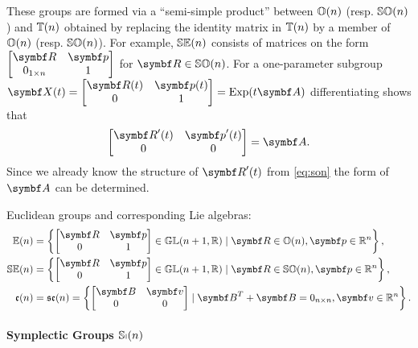 These groups are formed via a ``semi-simple product'' between ${\mathbb{O}(n)}$ (resp. ${\mathbb{SO}(n)}$) and ${\mathbb{T}(n)}$ obtained by replacing the identity matrix in ${\mathbb{T}(n)}$ by a member of ${\mathbb{O}(n)}$ (resp. ${\mathbb{SO}(n)}$). For example, ${\mathbb{SE}(n)}$ consists of matrices on the form $ \begin{bmatrix} \bR & \bp \\ 0_{1 \times n} & 1 \end{bmatrix} $ for $\bR \in \SOn$. For a one-parameter subgroup $\X(t) = \begin{bmatrix} \bR(t) & \bp(t) \\ 0 & 1 \end{bmatrix} = \Exp(t \A)$ differentiating shows that
\begin{equation}
  \begin{bmatrix} \bR'(t) & \bp'(t) \\ 0 & 0 \end{bmatrix} = \A.
\end{equation}
Since we already know the structure of $\bR'(t)$ from \eqref{eq:son} the form of $\A$ can be determined.
\begin{important}
  Euclidean groups and corresponding Lie algebras:
  \begin{subequations}
    \begin{align}
      \En  & = \left\{\begin{bmatrix} \bR & \bp \\ 0 & 1 \end{bmatrix} \in \GL(n+1, \mathbb{R}) \mid \bR \in \On, \bp \in \mathbb{R}^{n} \right\},  \\
      \SEn & = \left\{\begin{bmatrix} \bR & \bp \\ 0 & 1 \end{bmatrix} \in \GL(n+1, \mathbb{R}) \mid \bR \in \SOn, \bp \in \mathbb{R}^{n} \right\}, \\
      \en  & = \sen = \left\{\begin{bmatrix} \B & \bv \\ 0 & 0 \end{bmatrix} \mid \B^{T} + \B = 0_{n \times n}, \bv \in \mathbb{R}^{n} \right\}.
    \end{align}
  \end{subequations}
\end{important}

\paragraph{Symplectic Groups ${\mathbb{Sp}(n)}$}


